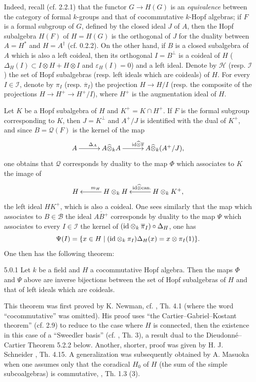 Indeed, recall (cf. 2.2.1) that the functor $G\to H(G)$ is an \emph{equivalence} between the category of formal $k$-groups and that of cocommutative $k$-Hopf algebras; if $F$ is a formal subgroup of $G$, defined by the closed ideal $J$ of $A$, then the Hopf subalgebra $H(F)$ of $H=H(G)$ is the orthogonal of $J$ for the duality between $A=H^*$ and $H=A^\dagger$ (cf. 0.2.2). On the other hand, if $B$ is a closed subalgebra of $A$ which is also a left coideal, then its orthogonal $I=B^\perp$ is a coideal of $H$ (\ie $\Delta_H(I)\subset I\otimes H+H\otimes I$ and $\varepsilon_H(I)=0$) and a left ideal. Denote by $\mathscr H$ (resp. $\mathscr I$) the set of Hopf subalgebras (resp. left ideals which are coideals) of $H$. For every $I\in\mathscr I$, denote by $\pi_I$ (resp. $\overline\pi_I$) the projection $H\to H/I$ (resp. the composite of the projections $H\to H^+\to H^+/I$), where $H^+$ is the augmentation ideal of $H$.

Let $K$ be a Hopf subalgebra of $H$ and $K^+=K\cap H^+$. If $F$ is the formal subgroup corresponding to $K$, then $J=K^\perp$ and $A^+/J$ is identified with the dual of $K^+$, and since $B=\mathcal Q(F)$ is the kernel of the map
\[
\xymatrix@C=30pt{A\ar[r]^{\Delta_A}&A\widehat\otimes_k A\ar[r]^{\id\widehat\otimes\overline\pi}&A\widehat\otimes_k(A^+/J),}
\]
one obtains that $\mathcal Q$ corresponds by duality to the map $\Phi$ which associates to $K$ the image of
\[
\xymatrix@C=30pt{H&H\otimes_k H\ar[l]_{m_H}&H\otimes_k K^+\ar[l]_{\id\widehat\otimes\mathrm{can.}},}
\]
\ie the left ideal $HK^+$, which is also a coideal. One sees similarly that the map which associates to $B\in\mathscr B$ the ideal $\overline{AB^+}$ corresponds by duality to the map $\Psi$ which associates to every $I\in\mathscr I$ the kernel of $(\mathrm{id}\otimes_k\overline\pi_I)\circ\Delta_H$, \ie one has
\[
\Psi(I)=\{x\in H\mid(\mathrm{id}\otimes_k\pi_I)\Delta_H(x)=x\otimes\pi_I(1)\}.
\]
One then has the following theorem:
\begin{theorem}{5.0.1}\label{VIIB.5.0.1}
Let $k$ be a field and $H$ a cocommutative Hopf algebra. Then the maps $\Phi$ and $\Psi$ above are inverse bijections between the set of Hopf subalgebras of $H$ and that of left ideals which are coideals.
\end{theorem}
This theorem was first proved by K. Newman, cf. \cite{Ne75}, Th. 4.1 (where the word ``cocommutative'' was omitted). His proof uses ``the Cartier--Gabriel--Kostant theorem'' (cf. 2.9) to reduce to the case where $H$ is connected, then the existence in this case of a ``Sweedler basis'' (cf. \cite{Sw67}, Th. 3), a result dual to the Dieudonné--Cartier Theorem 5.2.2 below. Another, shorter, proof was given by H. J. Schneider \cite{Sch90}, Th. 4.15. A generalization was subsequently obtained by A. Masuoka when one assumes only that the coradical $H_0$ of $H$ (\ie the sum of the simple subcoalgebras) is commutative, \cite{Ma91}, Th. 1.3 (3).


